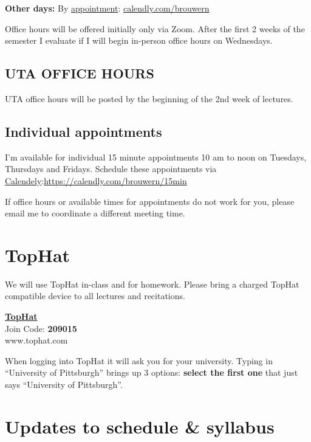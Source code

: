 \documentclass[
]{book}
\begin{document}
\textbf{Other days:} By \href{calendly.com/brouwern}{appointment}: \url{calendly.com/brouwern}

Office hours will be offered initially only via Zoom. After the first 2 weeks of the semester I evaluate if I will begin in-person office hours on Wednesdays.

\hypertarget{uta-office-hours}{%
\section{UTA OFFICE HOURS}\label{uta-office-hours}}

UTA office hours will be posted by the beginning of the 2nd week of lectures.\\

\hypertarget{individual-appointments}{%
\section{Individual appointments}\label{individual-appointments}}

I'm available for individual 15 minute appointments 10 am to noon on Tuesdays, Thursdays and Fridays. Schedule these appointments via \href{https://calendly.com/brouwern/15min}{Calendely}:\url{https://calendly.com/brouwern/15min}

If office hours or available times for appointments do not work for you, please email me to coordinate a different meeting time.

\hypertarget{tophat}{%
\chapter{TopHat}\label{tophat}}

We will use TopHat in-class and for homework. Please bring a charged TopHat compatible device to all lectures and recitations.

\href{www.tophat.com}{\textbf{TopHat}}\\
Join Code: \textbf{209015}\\
www.tophat.com

When logging into TopHat it will ask you for your university. Typing in ``University of Pittsburgh'' brings up 3 options: \textbf{select the first one} that just says ``University of Pittsburgh''.

\hypertarget{updates-to-schedule-syllabus}{%
\chapter{Updates to schedule \& syllabus}\label{updates-to-schedule-syllabus}}
\end{document}
